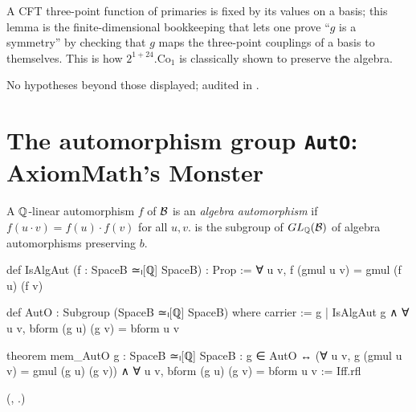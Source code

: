 \begin{physics}
A CFT three-point function of primaries is fixed by its values on a basis; this lemma is the
finite-dimensional bookkeeping that lets one prove ``$g$ is a symmetry'' by checking that $g$ maps the
three-point couplings of a basis to themselves.  This is how $2^{1+24}.\mathrm{Co}_1$ is classically
shown to preserve the algebra.
\end{physics}
\begin{status}
No hypotheses beyond those displayed; audited in .
\end{status}

\section{The automorphism group \texorpdfstring{\texttt{AutO}}{AutO}: AxiomMath's Monster}\label{ch21:sec:auto}

\begin{definition}\label{ch21:def:AutO}
A ${\mathbb{Q}}$-linear automorphism $f$ of $\mathcal{B}$ is an \emph{algebra automorphism} if
$f(u\cdot v)=f(u)\cdot f(v)$ for all $u,v$.   is the subgroup of $GL_{\mathbb{Q}}(\mathcal{B})$ of algebra
automorphisms preserving $b$.
\end{definition}
\begin{leancode}
def IsAlgAut (f : SpaceB ≃ₗ[ℚ] SpaceB) : Prop := ∀ u v, f (gmul u v) = gmul (f u) (f v)
\end{leancode}
\begin{leancode}
def AutO : Subgroup (SpaceB ≃ₗ[ℚ] SpaceB) where
  carrier := {g | IsAlgAut g ∧ ∀ u v, bform (g u) (g v) = bform u v}
\end{leancode}
\begin{leancode}
theorem mem_AutO {g : SpaceB ≃ₗ[ℚ] SpaceB} :
    g ∈ AutO ↔ (∀ u v, g (gmul u v) = gmul (g u) (g v)) ∧ ∀ u v, bform (g u) (g v) = bform u v :=
  Iff.rfl
\end{leancode}
(,
.)

